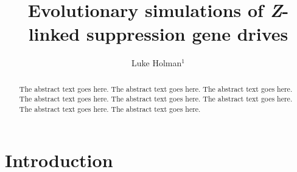 \documentclass[]{rsos}%
\begin{document}
\title{Evolutionary simulations of \emph{Z}-linked suppression gene drives}

\author{
Luke Holman$^{1}$}

\address{
  $^{1}$School of BioSciences, The University of Melbourne, Victoria 3010,
Australia.}
\subject{
Evolutionary biology,
Theoretical modelling,
Gene drives}



\begin{abstract}
The abstract text goes here. The abstract text goes here. The abstract
text goes here. The abstract text goes here. The abstract text goes
here. The abstract text goes here. The abstract text goes here. The
abstract text goes here.
\end{abstract}

\providecommand{\tightlist}{%
  \setlength{\itemsep}{0pt}\setlength{\parskip}{0pt}}
\providecommand{\EndFirstPage}{%
}

\maketitle

\hypertarget{introduction}{%
\section{Introduction}\label{introduction}}
\end{document}
